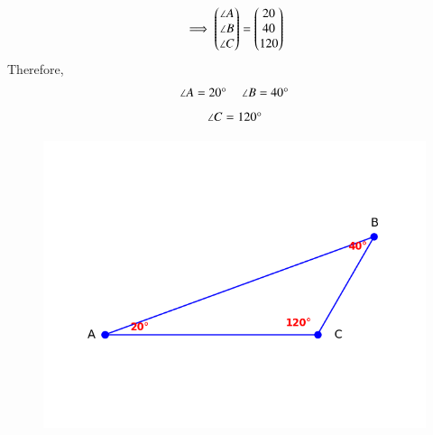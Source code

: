 \documentclass[journal]{IEEEtran}
\begin{document}
\begin{align}
    \implies \begin{pmatrix}\angle A \\ \angle B \\ \angle C\end{pmatrix} = \begin{pmatrix}20\\40\\120\end{pmatrix}
\end{align}
Therefore,
\begin{align*}
\angle A = 20\degree \ \ \ \ \ 
\angle B = 40\degree
\end{align*}
\begin{align*}
\angle C = 120\degree
\end{align*}

\begin{figure}[H]
\begin{center}
\includegraphics[width=0.7\columnwidth]{figs/fig.png}
\end{center}
\label{fig:Fig1}
\end{figure}
\end{document}
